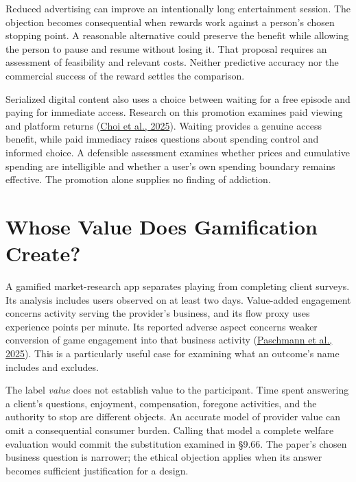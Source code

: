 Reduced advertising can improve an intentionally long entertainment
session. The objection becomes consequential when rewards work against a
person's chosen stopping point. A reasonable alternative could preserve
the benefit while allowing the person to pause and resume without losing
it. That proposal requires an assessment of feasibility and relevant
costs. Neither predictive accuracy nor the commercial success of the
reward settles the comparison.

Serialized digital content also uses a choice between waiting for a free
episode and paying for immediate access. Research on this promotion
examines paid viewing and platform returns
(\href{https://doi.org/10.1177/00222437241270194}{Choi et al., 2025}).
Waiting provides a genuine access benefit, while paid immediacy raises
questions about spending control and informed choice. A defensible
assessment examines whether prices and cumulative spending are
intelligible and whether a user's own spending boundary remains
effective. The promotion alone supplies no finding of addiction.


\hypertarget{M09-whose-value-does-gamification-create}{%
\section{Whose Value Does Gamification
Create?}\label{M09-whose-value-does-gamification-create}}

\noindent \noindent A gamified market-research app separates playing from
completing client surveys. Its analysis includes users observed on at
least two days. Value-added engagement concerns activity serving the
provider's business, and its flow proxy uses experience points per
minute. Its reported adverse aspect concerns weaker conversion of game
engagement into that business activity
(\href{https://doi.org/10.1177/00222437241275927}{Paschmann et al.,
2025}). This is a particularly useful case for examining what an
outcome's name includes and excludes.

The label \emph{value} does not establish value to the participant. Time
spent answering a client's questions, enjoyment, compensation, foregone
activities, and the authority to stop are different objects. An accurate
model of provider value can omit a consequential consumer burden.
Calling that model a complete welfare evaluation would commit the
substitution examined in §9.66. The paper's chosen business question is
narrower; the ethical objection applies when its answer becomes
sufficient justification for a design.


